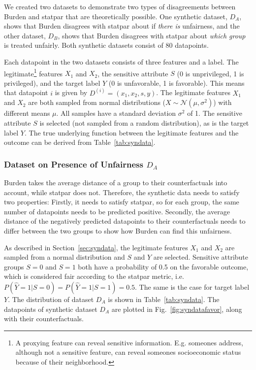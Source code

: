 \documentclass[runningheads]{llncs}
\begin{document}
We created two datasets to demonstrate two types of disagreements between \gls{Burden} and \gls{statpar} that are theoretically possible. One synthetic dataset, $D_A$, shows that \gls{Burden} disagrees with \gls{statpar} about if \textit{there is} unfairness, and the other dataset, $D_B$, shows that \gls{Burden} disagrees with \gls{statpar} about \emph{which group} is treated unfairly. Both synthetic datasets consist of 80 datapoints.

Each datapoint in the two datasets consists of three features and a label. The \gls{legitimate}\footnote{A proxying feature can reveal sensitive information. E.g. someones address, although not a sensitive feature, can reveal someones socioeconomic status because of their neighborhood.} features $X_1$ and 
$X_2$, the sensitive attribute $S$ (0 is unprivileged, 1 is privileged), and the target label $Y$ (0 is unfavorable, 1 is favorable). This means that datapoint $i$ is given by 
$ D^{(i)} = (x_1, x_2, s, y)$. The \gls{legitimate} features $X_1$ and $X_2$ are both sampled from normal distributions ($X \sim \mathcal{N}(\mu, \sigma^2)$) with different means $\mu$. All samples have a standard deviation $\sigma^2$ of 1. The sensitive attribute $S$ is selected (not sampled from a random distribution), as is the target label $Y$. The true underlying function between the legitimate features and the outcome can be derived from Table~\ref{tab:syndata}.

\subsubsection{Dataset on Presence of Unfairness $D_A$}
\gls{Burden} takes the average distance of a group to their counterfactuals into account, while \gls{statpar} does not. 
Therefore, the synthetic data needs to satisfy two properties: Firstly, it needs to satisfy \gls{statpar}, so for each group, the same number of datapoints needs to be predicted positive.
Secondly, the average distance of the negatively predicted datapoints to their counterfactuals needs to differ between the two groups to show how \gls{Burden} can find this unfairness.

As described in Section~\ref{sec:syndata}, the \gls{legitimate} features $X_1$ and $X_2$ are sampled from a normal distribution and $S$ and $Y$ are selected. Sensitive attribute groups $S=0$ and $S=1$ both have a probability of 0.5 on the favorable outcome, which is considered fair according to the \gls{statpar} metric, i.e. $P(\hat{Y}=1|S=0) = P(\hat{Y}=1|S=1) = 0.5$. The same is the case for target label $Y$. The distribution of dataset $D_A$ is shown in Table~\ref{tab:syndata}.
The datapoints of synthetic dataset $D_A$ are plotted in Fig.~\ref{fig:syndatafavor}, along with their counterfactuals. 
\end{document}
